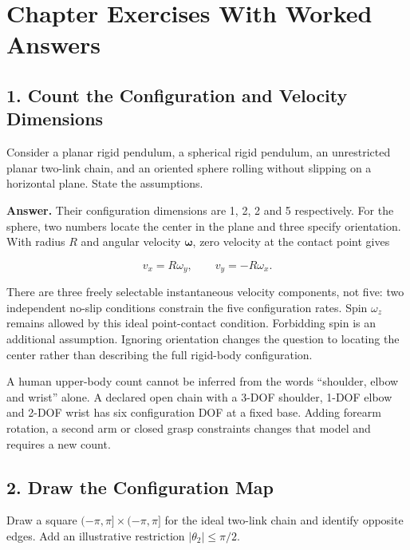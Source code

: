 \section{Chapter Exercises With Worked Answers}\label{ch02:chapter-exercises-with-worked-answers}

\protect{}\label{ch02:chapter-exercises}{}

\subsection*{1. Count the Configuration and Velocity Dimensions}\label{ch02:count-the-configuration-and-velocity-dimensions}

Consider a planar rigid pendulum, a spherical rigid pendulum, an unrestricted planar two-link chain, and an oriented sphere rolling without slipping on a horizontal plane. State the assumptions.

\textbf{Answer.} Their configuration dimensions are 1, 2, 2 and 5 respectively. For the sphere, two numbers locate the center in the plane and three specify orientation. With radius \(R\) and angular velocity \(\bm\omega\), zero velocity at the contact point gives

\[
v_x=R\omega_y,\qquad v_y=-R\omega_x.
\]

There are three freely selectable instantaneous velocity components, not five: two independent no-slip conditions constrain the five configuration rates. Spin \(\omega_z\) remains allowed by this ideal point-contact condition. Forbidding spin is an additional assumption. Ignoring orientation changes the question to locating the center rather than describing the full rigid-body configuration.

A human upper-body count cannot be inferred from the words ``shoulder, elbow and wrist'' alone. A declared open chain with a 3-DOF shoulder, 1-DOF elbow and 2-DOF wrist has six configuration DOF at a fixed base. Adding forearm rotation, a second arm or closed grasp constraints changes that model and requires a new count.

\subsection*{2. Draw the Configuration Map}\label{ch02:draw-the-configuration-map}

Draw a square \((-\pi,\pi]\times(-\pi,\pi]\) for the ideal two-link chain and identify opposite edges. Add an illustrative restriction \(|\theta_2|\leq\pi/2\).

